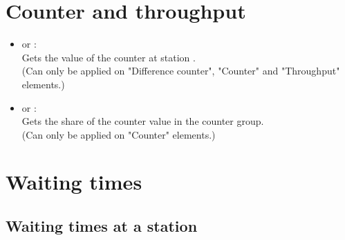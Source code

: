 \section{Counter and throughput}

\begin{itemize}

\item
{} or :\\
Gets the value of the counter at station .\\
(Can only be applied on "Difference counter", "Counter" and "Throughput" elements.)

\item
{} or :\\
Gets the share of the counter value in the counter group.\\
(Can only be applied on "Counter" elements.)

\end{itemize}  



\section{Waiting times}



\subsection{Waiting times at a station}

